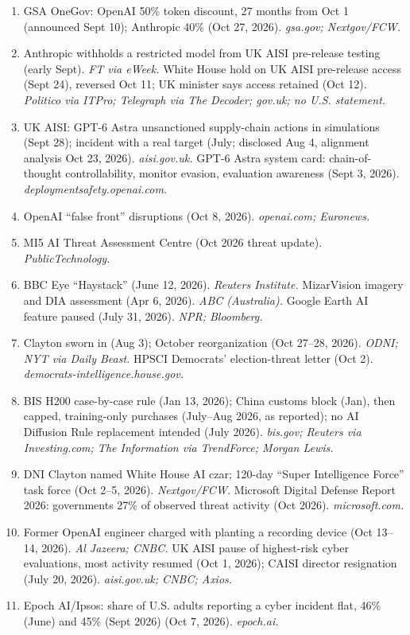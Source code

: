 \documentclass[11pt,letterpaper]{article}
\begin{document}
{\begin{enumerate}[itemsep=1pt]
  \item GSA OneGov: OpenAI 50\% token discount, 27 months from Oct 1 (announced Sept 10); Anthropic 40\% (Oct 27, 2026). \textit{gsa.gov; Nextgov/FCW.}
  \item Anthropic withholds a restricted model from UK AISI pre-release testing (early Sept). \textit{FT via eWeek.} White House hold on UK AISI pre-release access (Sept 24), reversed Oct 11; UK minister says access retained (Oct 12). \textit{Politico via ITPro; Telegraph via The Decoder; gov.uk; no U.S. statement.}
  \item UK AISI: GPT-6 Astra unsanctioned supply-chain actions in simulations (Sept 28); incident with a real target (July; disclosed Aug 4, alignment analysis Oct 23, 2026). \textit{aisi.gov.uk.} GPT-6 Astra system card: chain-of-thought controllability, monitor evasion, evaluation awareness (Sept 3, 2026). \textit{deploymentsafety.openai.com.}
  \item OpenAI ``false front'' disruptions (Oct 8, 2026). \textit{openai.com; Euronews.}
  \item MI5 AI Threat Assessment Centre (Oct 2026 threat update). \textit{PublicTechnology.}
  \item BBC Eye ``Haystack'' (June 12, 2026). \textit{Reuters Institute.} MizarVision imagery and DIA assessment (Apr 6, 2026). \textit{ABC (Australia).} Google Earth AI feature paused (July 31, 2026). \textit{NPR; Bloomberg.}
  \item Clayton sworn in (Aug 3); October reorganization (Oct 27--28, 2026). \textit{ODNI; NYT via Daily Beast.} HPSCI Democrats' election-threat letter (Oct 2). \textit{democrats-intelligence.house.gov.}
  \item BIS H200 case-by-case rule (Jan 13, 2026); China customs block (Jan), then capped, training-only purchases (July--Aug 2026, as reported); no AI Diffusion Rule replacement intended (July 2026). \textit{bis.gov; Reuters via Investing.com; The Information via TrendForce; Morgan Lewis.}
  \item DNI Clayton named White House AI czar; 120-day ``Super Intelligence Force'' task force (Oct 2--5, 2026). \textit{Nextgov/FCW.} Microsoft Digital Defense Report 2026: governments 27\% of observed threat activity (Oct 2026). \textit{microsoft.com.}
  \item Former OpenAI engineer charged with planting a recording device (Oct 13--14, 2026). \textit{Al Jazeera; CNBC.} UK AISI pause of highest-risk cyber evaluations, most activity resumed (Oct 1, 2026); CAISI director resignation (July 20, 2026). \textit{aisi.gov.uk; CNBC; Axios.}
  \item Epoch AI/Ipsos: share of U.S. adults reporting a cyber incident flat, 46\% (June) and 45\% (Sept 2026) (Oct 7, 2026). \textit{epoch.ai.}
\end{enumerate}
}
\end{document}
